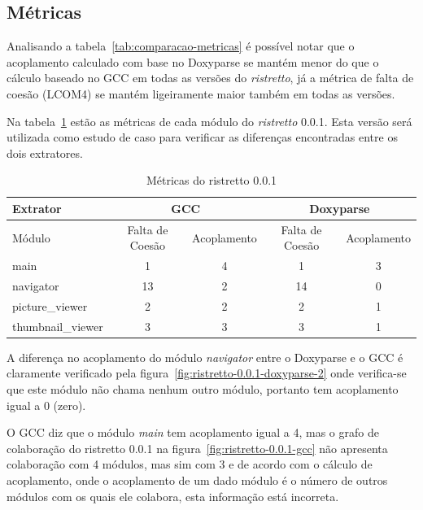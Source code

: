 \subsection{Métricas}

Analisando a tabela~\ref{tab:comparacao-metricas} é possível notar que o
acoplamento calculado com base no Doxyparse se mantém menor do que o cálculo
baseado no GCC em todas as versões do {\it ristretto}, já a métrica de falta de
coesão (LCOM4) se mantém ligeiramente maior também em todas as versões.

Na tabela~\ref{tab:comparacao-metricas-ristretto-0.0.1} estão as métricas de
cada módulo do {\it ristretto} 0.0.1. Esta versão será utilizada como estudo de
caso para verificar as diferenças encontradas entre os dois extratores.

\begin{table}
\caption{Métricas do ristretto 0.0.1}
\centering
\begin{tabular}{| l | c c | c c |}
\hline
Extrator          & \multicolumn{2}{|c|}{GCC}        & \multicolumn{2}{|c|}{Doxyparse} \\
\hline
Módulo            & Falta de Coesão & Acoplamento    & Falta de Coesão & Acoplamento   \\
\hline
main              & 1               & 4              & 1               & 3             \\
navigator         & 13              & 2              & 14              & 0             \\
picture\_viewer   & 2               & 2              & 2               & 1             \\
thumbnail\_viewer & 3               & 3              & 3               & 1             \\
\hline
\end{tabular}
\label{tab:comparacao-metricas-ristretto-0.0.1}
\end{table}

A diferença no acoplamento do módulo {\it navigator} entre o Doxyparse e o GCC
é claramente verificado pela figura~\ref{fig:ristretto-0.0.1-doxyparse-2} onde
verifica-se que este módulo não chama nenhum outro módulo, portanto tem
acoplamento igual a 0 (zero).

O GCC diz que o módulo {\it main} tem acoplamento igual a 4, mas o grafo de
colaboração do ristretto 0.0.1 na figura~\ref{fig:ristretto-0.0.1-gcc} não
apresenta colaboração com 4 módulos, mas sim com 3 e de acordo com o cálculo de
acoplamento, onde o acoplamento de um dado módulo é o número de outros módulos
com os quais ele colabora, esta informação está incorreta.

